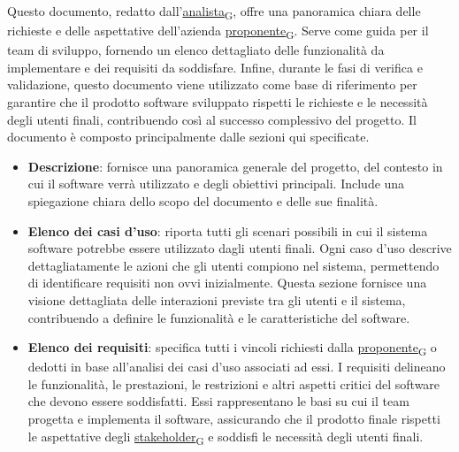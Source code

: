 Questo documento, redatto dall'\href{https://7last.github.io/docs/rtb/documentazione-interna/glossario\#analista}{analista\textsubscript{G}}, offre una panoramica chiara delle richieste e delle aspettative dell'azienda \href{https://7last.github.io/docs/rtb/documentazione-interna/glossario\#proponente}{proponente\textsubscript{G}}. Serve come guida per il team di sviluppo, fornendo un elenco dettagliato delle funzionalità da implementare e dei requisiti da soddisfare. Infine, durante le fasi di verifica e validazione, questo documento viene utilizzato come base di riferimento per garantire che il prodotto software sviluppato rispetti le richieste e le necessità degli utenti finali, contribuendo così al successo complessivo del progetto.
Il documento è composto principalmente dalle sezioni qui specificate.
\begin{itemize}
	\item \textbf{Descrizione}: fornisce una panoramica generale del progetto, del contesto in cui il software verrà utilizzato e degli obiettivi principali. Include una spiegazione chiara dello scopo del documento e delle sue finalità.
	\item \textbf{Elenco dei casi d'uso}: riporta tutti gli scenari possibili in cui il sistema software potrebbe essere utilizzato dagli utenti finali. Ogni caso d'uso descrive dettagliatamente le azioni che gli utenti compiono nel sistema, permettendo di identificare requisiti non ovvi inizialmente. Questa sezione fornisce una visione dettagliata delle interazioni previste tra gli utenti e il sistema, contribuendo a definire le funzionalità e le caratteristiche del software.
	\item \textbf{Elenco dei requisiti}: specifica tutti i vincoli richiesti dalla \href{https://7last.github.io/docs/rtb/documentazione-interna/glossario\#proponente}{proponente\textsubscript{G}} o dedotti in base all'analisi dei casi d'uso associati ad essi. I requisiti delineano le funzionalità, le prestazioni, le restrizioni e altri aspetti critici del software che devono essere soddisfatti. Essi rappresentano le basi su cui il team progetta e implementa il software, assicurando che il prodotto finale rispetti le aspettative degli \href{https://7last.github.io/docs/rtb/documentazione-interna/glossario\#stakeholder}{stakeholder\textsubscript{G}} e soddisfi le necessità degli utenti finali.
\end{itemize}

